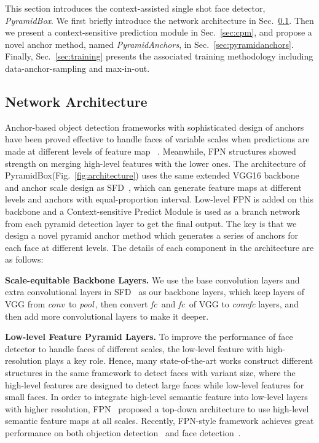 \documentclass[runningheads]{llncs}
\begin{document}
This section introduces the context-assisted single shot face detector, \emph{PyramidBox}.
We first briefly introduce
the network architecture in Sec.~\ref{sec:LFPN}.
Then we present a context-sensitive prediction module in Sec.~\ref{sec:cpm},
and propose a novel anchor method, named \emph{PyramidAnchors}, in Sec.~\ref{sec:pyramidanchors}.
Finally, Sec.~\ref{sec:training} presents the associated training methodology
including data-anchor-sampling and max-in-out.

\subsection{Network Architecture}
\label{sec:LFPN}

Anchor-based object detection frameworks with sophisticated design of anchors have been proved effective to handle faces of variable scales when predictions are made at different
levels of feature map ~\cite{Ren2015,Liu2016,Najibi2017,Zhang2017,Wang2017b}.
Meanwhile, FPN structures showed strength on merging high-level features with the lower ones.
The architecture of PyramidBox(Fig.~\ref{fig:architecture}) uses the same extended VGG16
backbone and anchor scale design as SFD~\cite{Zhang2017}, which can generate feature maps
at different levels and anchors with equal-proportion interval. Low-level FPN is added on this
backbone and a Context-sensitive Predict Module is used as a branch network from each pyramid
detection layer to get the final output. The key is that we design a novel pyramid anchor method
which generates a series of anchors for each face at different levels.
The details of each component in the architecture are as follows:

\textbf{Scale-equitable Backbone Layers.} We use the base convolution layers and extra convolutional layers
in SFD~\cite{Zhang2017} as our backbone layers, which keep layers of VGG from \emph{conv\,}
to \emph{pool\,}, then convert \emph{fc\,} and
\emph{fc\,} of VGG to \emph{convfc} layers,
and then add more convolutional layers to make it deeper.

\textbf{Low-level Feature Pyramid Layers.}
To improve the performance of face detector to handle faces of different scales, the low-level feature with high-resolution plays a key role.
Hence, many state-of-the-art works\cite{Yang2017,Zhang2017,Wang2017b,Najibi2017}
construct different structures in the same framework to detect faces with variant size, where
the high-level features are designed to detect large faces while low-level features for small faces.
In order to integrate high-level semantic feature into low-level layers with higher resolution,
FPN~\cite{Lin2017} proposed a top-down architecture to use high-level semantic feature maps
at all scales. Recently, FPN-style framework achieves great performance on both objection detection~\cite{Lin2017b}
and face detection~\cite{Wang2017b}.
\end{document}
